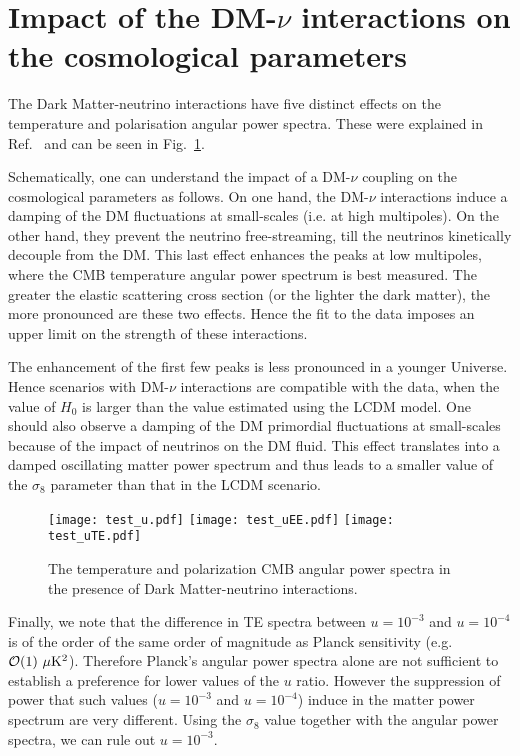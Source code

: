\documentclass[aps,prd,a4paper,twocolumn,amsmath,showpacs,superscriptaddress,nofootinbib,preprintnumbers]{revtex4-1}
\begin{document}
\section{Impact of the DM-$\nu$ interactions on the cosmological parameters \label{sec:dmnurecap}}

The Dark Matter-neutrino interactions have five distinct effects on the temperature and polarisation angular power spectra. These were explained in Ref.~\cite{Wilkinson:2014ksa} and can be seen in Fig.~\ref{fig1}. 

Schematically, one can understand the impact of a DM-$\nu$ coupling on the cosmological parameters as follows. On one hand, the DM-$\nu$  interactions induce a damping of the DM fluctuations at small-scales (i.e. at high multipoles). On the other hand, they prevent the  neutrino free-streaming, till the neutrinos kinetically decouple from the DM. This last effect enhances the peaks at low multipoles, where the CMB temperature angular power spectrum is best measured. The greater the elastic scattering cross section (or the lighter the dark matter), the more pronounced are these two effects. Hence the fit to the data imposes an upper limit on the strength of these interactions.  


The enhancement of the first few peaks is  less pronounced in a younger Universe. Hence scenarios with DM-$\nu$ interactions are  compatible with the data, when the value of $H_0$ is larger than the value estimated using the LCDM model.  One should  also observe a damping of the DM primordial fluctuations at small-scales because of the impact of neutrinos on the DM fluid. This effect translates into a damped oscillating matter power spectrum \cite{Boehm:2001hm} and thus leads to a smaller value of the $\sigma_8$ parameter than that in the LCDM scenario. 

\begin{figure}
\centering
\texttt{[image: test\_u.pdf]}
\texttt{[image: test\_uEE.pdf]}
\texttt{[image: test\_uTE.pdf]}
\caption{The temperature and polarization CMB angular power spectra in the presence of Dark Matter-neutrino interactions.}
\label{fig1}
\end{figure}

Finally, we note that the difference in TE spectra between $u=10^{-3}$ and $u=10^{-4}$ is of the order of the same order of magnitude as Planck sensitivity (e.g. ${\cal{O}}(1) \  \mu\rm{K}^2$). Therefore Planck's angular power spectra alone are not sufficient to establish a preference for lower values of the $u$ ratio. However the suppression of power that such values ($u=10^{-3}$ and $u=10^{-4}$)  induce in the matter power spectrum are very different.  Using the $\sigma_8$ value together with the angular power spectra, we can rule out $u=10^{-3}$.    
\end{document}
